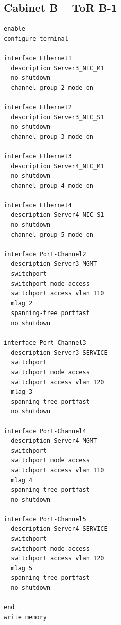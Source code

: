 \subsection{Cabinet B -- ToR B-1}
\begin{lstlisting}[caption={ToR B-1: downlinks to Servers 3 and 4.},basicstyle=\ttfamily\footnotesize,breaklines=true]
enable
configure terminal

interface Ethernet1
  description Server3_NIC_M1
  no shutdown
  channel-group 2 mode on

interface Ethernet2
  description Server3_NIC_S1
  no shutdown
  channel-group 3 mode on

interface Ethernet3
  description Server4_NIC_M1
  no shutdown
  channel-group 4 mode on

interface Ethernet4
  description Server4_NIC_S1
  no shutdown
  channel-group 5 mode on

interface Port-Channel2
  description Server3_MGMT
  switchport
  switchport mode access
  switchport access vlan 110
  mlag 2
  spanning-tree portfast
  no shutdown

interface Port-Channel3
  description Server3_SERVICE
  switchport
  switchport mode access
  switchport access vlan 120
  mlag 3
  spanning-tree portfast
  no shutdown

interface Port-Channel4
  description Server4_MGMT
  switchport
  switchport mode access
  switchport access vlan 110
  mlag 4
  spanning-tree portfast
  no shutdown

interface Port-Channel5
  description Server4_SERVICE
  switchport
  switchport mode access
  switchport access vlan 120
  mlag 5
  spanning-tree portfast
  no shutdown

end
write memory
\end{lstlisting}

